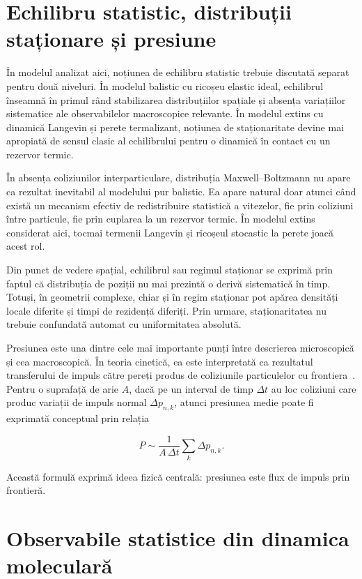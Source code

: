 \documentclass[12pt,openright,twoside]{book}
\begin{document}
\section{Echilibru statistic, distribuții staționare și presiune}

În modelul analizat aici, noțiunea de echilibru statistic trebuie discutată separat pentru două niveluri. În modelul balistic cu ricoșeu elastic ideal, echilibrul înseamnă în primul rând stabilizarea distribuțiilor spațiale și absența variațiilor sistematice ale observabilelor macroscopice relevante. În modelul extins cu dinamică Langevin și perete termalizant, noțiunea de staționaritate devine mai apropiată de sensul clasic al echilibrului pentru o dinamică în contact cu un rezervor termic.

În absența coliziunilor interparticulare, distribuția Maxwell--Boltzmann nu apare ca rezultat inevitabil al modelului pur balistic. Ea apare natural doar atunci când există un mecanism efectiv de redistribuire statistică a vitezelor, fie prin coliziuni între particule, fie prin cuplarea la un rezervor termic. În modelul extins considerat aici, tocmai termenii Langevin și ricoșeul stocastic la perete joacă acest rol.

Din punct de vedere spațial, echilibrul sau regimul staționar se exprimă prin faptul că distribuția de poziții nu mai prezintă o derivă sistematică în timp. Totuși, în geometrii complexe, chiar și în regim staționar pot apărea densități locale diferite și timpi de rezidență diferiți. Prin urmare, staționaritatea nu trebuie confundată automat cu uniformitatea absolută.

Presiunea este una dintre cele mai importante punți între descrierea microscopică și cea macroscopică. În teoria cinetică, ea este interpretată ca rezultatul transferului de impuls către pereți produs de coliziunile particulelor cu frontiera~\cite{cercignani1988}. Pentru o suprafață de arie $A$, dacă pe un interval de timp $\Delta t$ au loc coliziuni care produc variații de impuls normal $\Delta p_{n,k}$, atunci presiunea medie poate fi exprimată conceptual prin relația

\begin{equation}
    P \sim \frac{1}{A\,\Delta t}\sum_k \Delta p_{n,k}.
\end{equation}

Această formulă exprimă ideea fizică centrală: presiunea este flux de impuls prin frontieră.

\section{Observabile statistice din dinamica moleculară}
\label{subsec:observabile}
\end{document}
